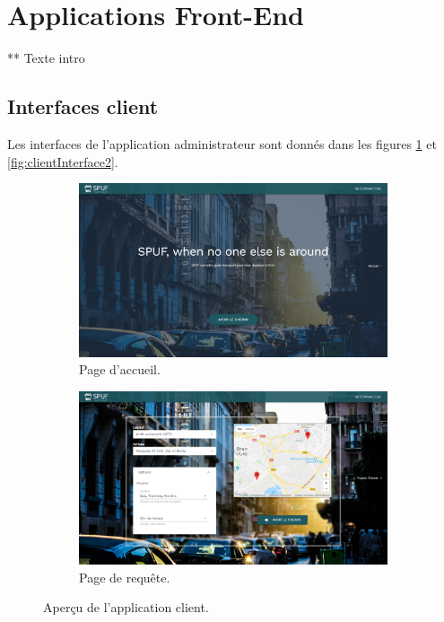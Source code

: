 \section{Applications Front-End}
\label{ref:Implementation}

** Texte intro
\subsection{Interfaces client}
Les interfaces de l'application administrateur sont donnés dans les figures \ref{fig:clientInterface} et \ref{fig:clientInterface2}.

\begin{figure}[h!]

	 \begin{subfigure}[b]{\linewidth}
	 	\includegraphics[width=\linewidth]{img/spuf/acceuil.png}
	 	\caption{Page d'accueil.}
	 \end{subfigure}
	 
	 \begin{subfigure}[b]{\linewidth}
	 	\includegraphics[width=\linewidth]{img/spuf/request.png}
	 	\caption{Page de requête.}	 
	 \end{subfigure}
	 
	\caption{Aperçu de l'application client.}
	 \label{fig:clientInterface}
\end{figure}


